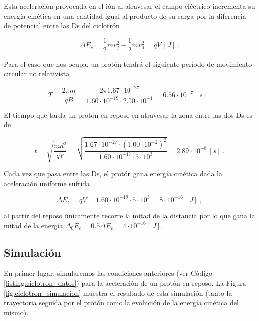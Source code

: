 \documentclass[journal]{IEEEtran}
\begin{document}
Esta aceleración provocada en el ión al atravesar el campo eléctrico incrementa su energía cinética en una cantidad igual al producto de su carga por la diferencia de potencial entre las Ds del ciclotrón

\begin{equation}
\Delta E_c = \displaystyle\frac{1}{2}mv_f^2 - \displaystyle\frac{1}{2}mv_0^2 = qV~[J]~.
\end{equation}

Para el caso que nos ocupa, un protón tendrá el siguiente período de movimiento circular no relativista

\begin{equation}
T = \displaystyle\frac{2\pi m}{qB} = \displaystyle\frac{2\pi 1.67\cdot10^{-27}}{1.60\cdot 10^{-19}\cdot 2.00\cdot 10^{-1}} = 6.56\cdot 10^{-7}~[s]~.
\end{equation}

El tiempo que tarda un protón en reposo en atravesar la zona entre las dos Ds es de

\begin{equation}
t = \sqrt{\displaystyle\frac{md^2}{qV}} = \sqrt{\displaystyle\frac{1.67\cdot 10^{-27}\cdot (1.00\cdot 10^{-2})^2}{1.60\cdot 10^{-19}\cdot 5\cdot 10^3}} = 2.89\cdot 10^{-8}~[s]~.
\end{equation}

Cada vez que pasa entre las Ds, el protón gana energía cinética dada la aceleración uniforme sufrida

\begin{equation}
\Delta E_c = qV = 1.60\cdot 10^{-19} \cdot 5\cdot 10^3 = 8\cdot 10^{-16}~[J]~,
\end{equation}

al partir del reposo únicamente recorre la mitad de la distancia por lo que gana la mitad de la energía $\Delta_0 E_c = 0.5 \Delta E_c = 4\cdot 10^{-16}~[J]$.

\subsection{Simulación}

En primer lugar, simularemos las condiciones anteriores (ver Código \ref{listing:ciclotron_datos}) para la aceleración de un protón en reposo. La Figura \ref{fig:ciclotron_simulacion} muestra el resultado de esta simulación (tanto la trayectoria seguida por el protón como la evolución de la energía cinética del mismo).

\bigskip
\end{document}
